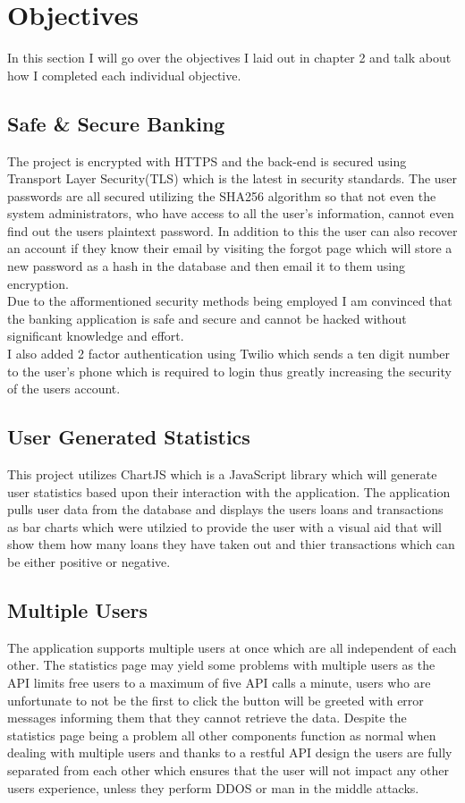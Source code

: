 \section{Objectives}
In this section I will go over the objectives I laid out in chapter 2 and talk about how I completed each individual objective.
\subsection{Safe \& Secure Banking}
The project is encrypted with HTTPS and the back-end is secured using Transport
Layer Security(TLS) which is the latest in security standards.  The user passwords
are all secured utilizing the SHA256 algorithm so that not even the system administrators,
who have access to all the user's information, cannot even find out the users plaintext
password.  In addition to this the user can also recover an account if they know their email
by visiting the forgot page which will store a new password as a hash in the database and
then email it to them using encryption.
\\
Due to the afformentioned security methods being employed I am convinced that the
banking application is safe and secure and cannot be hacked without significant knowledge
and effort.
\\
I also added 2 factor authentication using Twilio which sends a ten digit number to the user's phone
which is required to login thus greatly increasing the security of the users account.
\subsection{User Generated Statistics}
This project utilizes ChartJS which is a JavaScript library which will generate
user statistics based upon their interaction with the application.  The application
pulls user data from the database and displays the users loans and transactions as
bar charts which were utilzied to provide the user with a visual aid that will show
them how many loans they have taken out and thier transactions which can be either
positive or negative.
\subsection{Multiple Users}
The application supports multiple users at once which are all independent of each
other.  The statistics page may yield some problems with multiple users as the
API limits free users to a maximum of five API calls a minute, users who are unfortunate
to not be the first to click the button will be greeted with error messages informing them
that they cannot retrieve the data.  Despite the statistics page being a problem all other
components function as normal when dealing with multiple users and thanks to a restful API
design the users are fully separated from each other which ensures that the user will not
impact any other users experience, unless they perform DDOS or man in the middle attacks.
